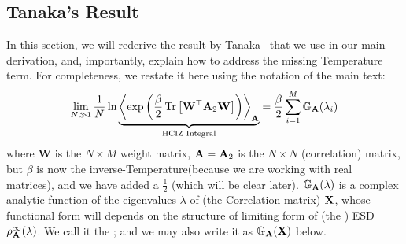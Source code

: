 \subsection{Tanaka's Result}
\label{sxn:tanaka}

In this section, we will rederive the result by Tanaka~\cite{Tanaka2007,Tanaka2008} that we use in our main derivation,
and, importantly, explain how to address the missing Temperature term.
For completeness, we restate it here using the notation of the main text:
\begin{equation}
  \label{eqn:hciz}
  \lim_{N \gg 1} \frac{1}{N} \ln 
\underbrace{
  \Expected[\mathbf{\AMAT}]{
    \exp\left(\frac{\beta}{2}
    \Trace{\mathbf{W}^{\top} \AMAT_{2} \mathbf{W}}
    \right)
  }
 }_{\text{HCIZ Integral}}
  = \frac{\beta}{2} \sum_{i=1}^{M} \GNORM(\lambda_{i})
\end{equation}
where 
$\mathbf{W}$ is the $N\times M$ \Teacher weight matrix, 
$\mathbf{A}=\mathbf{A}_{2}$ is the $N\times N$ \Student (correlation) matrix, 
but $\beta$ is now the inverse-Temperature(because we are working with real matrices),
and we have added a $\tfrac{1}{2}$ (which will be clear later).
$\mathbb{G}_{\mathbf{A}}(\lambda)$ is a complex analytic function of the eigenvalues $\lambda$ of (the \Teacher Correlation matrix) $\mathbf{X}$, 
whose functional form will depends on the structure of limiting form of (the \Student) ESD $\rho_{\mathbf{A}}^{\infty}(\lambda)$.
We call it the \emph{ \GeneratingFunction};
and we may also write it as $\mathbb{G}_{\mathbf{A}}(\mathbf{X})$ below.

